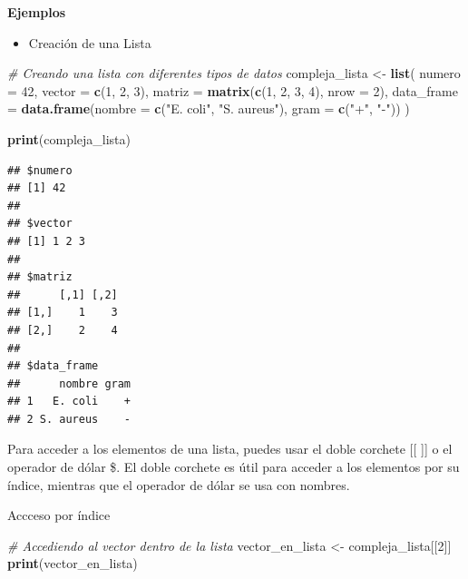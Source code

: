 \documentclass[
]{book}
\newenvironment{Shaded}{\begin{snugshade}}{\end{snugshade}}
\newcommand{\AttributeTok}[1]{\textcolor[rgb]{0.13,0.29,0.53}{#1}}
\newcommand{\CommentTok}[1]{\textcolor[rgb]{0.56,0.35,0.01}{\textit{#1}}}
\newcommand{\DecValTok}[1]{\textcolor[rgb]{0.00,0.00,0.81}{#1}}
\newcommand{\FunctionTok}[1]{\textcolor[rgb]{0.13,0.29,0.53}{\textbf{#1}}}
\newcommand{\NormalTok}[1]{#1}
\newcommand{\OtherTok}[1]{\textcolor[rgb]{0.56,0.35,0.01}{#1}}
\newcommand{\StringTok}[1]{\textcolor[rgb]{0.31,0.60,0.02}{#1}}
\providecommand{\tightlist}{%
  \setlength{\itemsep}{0pt}\setlength{\parskip}{0pt}}
\begin{document}
\textbf{Ejemplos}

\begin{itemize}
\tightlist
\item
  Creación de una Lista
\end{itemize}

\begin{Shaded}
\begin{Highlighting}[]
\CommentTok{\# Creando una lista con diferentes tipos de datos}
\NormalTok{compleja\_lista }\OtherTok{\textless{}{-}} \FunctionTok{list}\NormalTok{(}
  \AttributeTok{numero =} \DecValTok{42}\NormalTok{,}
  \AttributeTok{vector =} \FunctionTok{c}\NormalTok{(}\DecValTok{1}\NormalTok{, }\DecValTok{2}\NormalTok{, }\DecValTok{3}\NormalTok{),}
  \AttributeTok{matriz =} \FunctionTok{matrix}\NormalTok{(}\FunctionTok{c}\NormalTok{(}\DecValTok{1}\NormalTok{, }\DecValTok{2}\NormalTok{, }\DecValTok{3}\NormalTok{, }\DecValTok{4}\NormalTok{), }\AttributeTok{nrow =} \DecValTok{2}\NormalTok{),}
  \AttributeTok{data\_frame =} \FunctionTok{data.frame}\NormalTok{(}\AttributeTok{nombre =} \FunctionTok{c}\NormalTok{(}\StringTok{"E. coli"}\NormalTok{, }\StringTok{"S. aureus"}\NormalTok{), }\AttributeTok{gram =} \FunctionTok{c}\NormalTok{(}\StringTok{"+"}\NormalTok{, }\StringTok{"{-}"}\NormalTok{))}
\NormalTok{)}

\FunctionTok{print}\NormalTok{(compleja\_lista)}
\end{Highlighting}
\end{Shaded}

\begin{verbatim}
## $numero
## [1] 42
## 
## $vector
## [1] 1 2 3
## 
## $matriz
##      [,1] [,2]
## [1,]    1    3
## [2,]    2    4
## 
## $data_frame
##      nombre gram
## 1   E. coli    +
## 2 S. aureus    -
\end{verbatim}

Para acceder a los elementos de una lista, puedes usar el doble corchete {[}{[} {]}{]} o el operador de dólar \$. El doble corchete es útil para acceder a los elementos por su índice, mientras que el operador de dólar se usa con nombres.

Accceso por índice

\begin{Shaded}
\begin{Highlighting}[]
\CommentTok{\# Accediendo al vector dentro de la lista}
\NormalTok{vector\_en\_lista }\OtherTok{\textless{}{-}}\NormalTok{ compleja\_lista[[}\DecValTok{2}\NormalTok{]]}
\FunctionTok{print}\NormalTok{(vector\_en\_lista)}
\end{Highlighting}
\end{Shaded}
\end{document}
